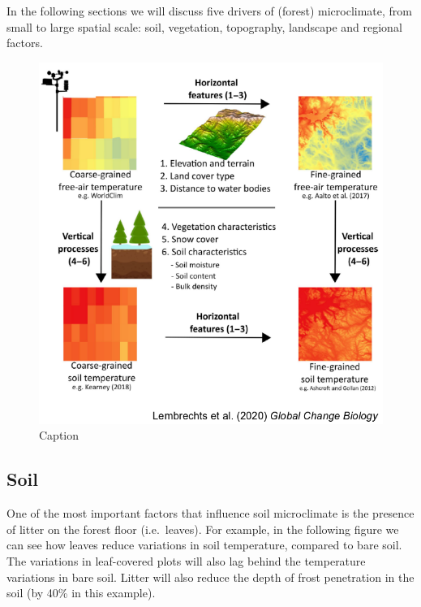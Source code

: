 \documentclass[12pt,oneside]{book}
\begin{document}
In the following sections we will discuss five drivers of (forest)
microclimate, from small to large spatial scale: soil, vegetation,
topography, landscape and regional factors.

\begin{figure}

{\centering \includegraphics[width=0.8\linewidth]{figures/Figure1012} 

}

\caption{Caption}\label{fig:Micro12}
\end{figure}

\subsection{Soil}\label{soil}

One of the most important factors that influence soil microclimate is
the presence of litter on the forest floor (i.e.~leaves). For example,
in the following figure we can see how leaves reduce variations in soil
temperature, compared to bare soil. The variations in leaf-covered plots
will also lag behind the temperature variations in bare soil. Litter
will also reduce the depth of frost penetration in the soil (by 40\% in
this example).
\end{document}
